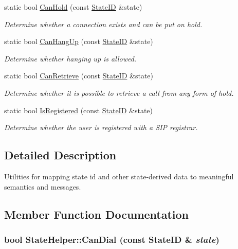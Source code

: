 \begin{CompactItemize}
static bool \hyperlink{classStateHelper_c946e6f713969a2092d3e2c7ec004a7a}{CanHold} (const \hyperlink{state_8h_2c309f64131cbfdae6d95e6591f208e6}{StateID} \&state)
\begin{CompactList}\small\item\em Determine whether a connection exists and can be put on hold. \item\end{CompactList}\item 
static bool \hyperlink{classStateHelper_8ab96f1d7b7413154e5297ef22af93bb}{CanHangUp} (const \hyperlink{state_8h_2c309f64131cbfdae6d95e6591f208e6}{StateID} \&state)
\begin{CompactList}\small\item\em Determine whether hanging up is allowed. \item\end{CompactList}\item 
static bool \hyperlink{classStateHelper_a563c5e68e7da3e9b763d402da50605c}{CanRetrieve} (const \hyperlink{state_8h_2c309f64131cbfdae6d95e6591f208e6}{StateID} \&state)
\begin{CompactList}\small\item\em Determine whether it is possible to retrieve a call from any form of hold. \item\end{CompactList}\item 
static bool \hyperlink{classStateHelper_9c0a814cd8b3104a30dc9b6d5a4c1aab}{IsRegistered} (const \hyperlink{state_8h_2c309f64131cbfdae6d95e6591f208e6}{StateID} \&state)
\begin{CompactList}\small\item\em Determine whether the user is registered with a SIP registrar. \item\end{CompactList}\end{CompactItemize}


\subsection{Detailed Description}
Utilities for mapping state id and other state-derived data to meaningful semantics and messages. 

\subsection{Member Function Documentation}
\hypertarget{classStateHelper_dd3c36b37666dde08e682f49d999b510}{
\subsubsection[{CanDial}]{\setlength{\rightskip}{0pt plus 5cm}bool StateHelper::CanDial (const {\bf StateID} \& {\em state})}}
\label{classStateHelper_dd3c36b37666dde08e682f49d999b510}


